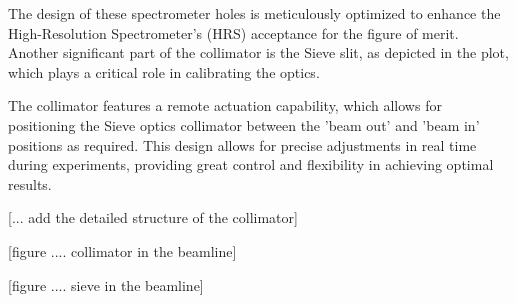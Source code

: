 The design of these spectrometer holes is meticulously optimized to enhance the High-Resolution Spectrometer's (HRS) acceptance for the figure of merit. Another significant part of the collimator is the Sieve slit, as depicted in the plot, which plays a critical role in calibrating the optics.

The collimator features a remote actuation capability, which allows for positioning the Sieve optics collimator between the 'beam out' and 'beam in' positions as required. This design allows for precise adjustments in real time during experiments, providing great control and flexibility in achieving optimal results.

[... add the detailed structure of the collimator]

[figure .... collimator in the beamline]

[figure .... sieve in the beamline]


